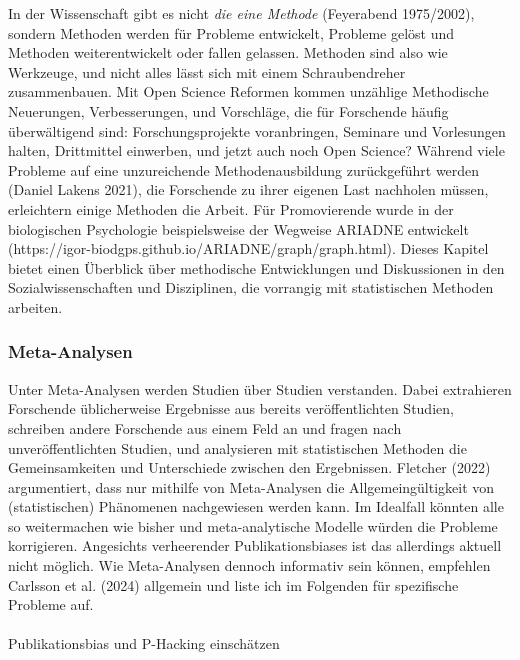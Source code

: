\documentclass[
  letterpaper,
  DIV=11,
  numbers=noendperiod]{scrreprt}
\makeatletter
\let\oldparagraph\paragraph
\renewcommand{\paragraph}{
    \@ifstar
      \xxxParagraphStar
      \xxxParagraphNoStar
  }
\newcommand{\xxxParagraphStar}[1]{\oldparagraph*{#1}\mbox{}}
\newcommand{\xxxParagraphNoStar}[1]{\oldparagraph{#1}\mbox{}}
\makeatother
\begin{document}
In der Wissenschaft gibt es nicht \emph{die eine Methode} (Feyerabend
1975/2002), sondern Methoden werden für Probleme entwickelt, Probleme
gelöst und Methoden weiterentwickelt oder fallen gelassen. Methoden sind
also wie Werkzeuge, und nicht alles lässt sich mit einem Schraubendreher
zusammenbauen. Mit Open Science Reformen kommen unzählige Methodische
Neuerungen, Verbesserungen, und Vorschläge, die für Forschende häufig
überwältigend sind: Forschungsprojekte voranbringen, Seminare und
Vorlesungen halten, Drittmittel einwerben, und jetzt auch noch Open
Science? Während viele Probleme auf eine unzureichende
Methodenausbildung zurückgeführt werden (Daniel Lakens 2021), die
Forschende zu ihrer eigenen Last nachholen müssen, erleichtern einige
Methoden die Arbeit. Für Promovierende wurde in der biologischen
Psychologie beispielsweise der Wegweise ARIADNE entwickelt
(https://igor-biodgps.github.io/ARIADNE/graph/graph.html). Dieses
Kapitel bietet einen Überblick über methodische Entwicklungen und
Diskussionen in den Sozialwissenschaften und Disziplinen, die vorrangig
mit statistischen Methoden arbeiten.

\subsubsection{Meta-Analysen}\label{meta-analysen}

Unter Meta-Analysen werden Studien über Studien verstanden. Dabei
extrahieren Forschende üblicherweise Ergebnisse aus bereits
veröffentlichten Studien, schreiben andere Forschende aus einem Feld an
und fragen nach unveröffentlichten Studien, und analysieren mit
statistischen Methoden die Gemeinsamkeiten und Unterschiede zwischen den
Ergebnissen. Fletcher (2022) argumentiert, dass nur mithilfe von
Meta-Analysen die Allgemeingültigkeit von (statistischen) Phänomenen
nachgewiesen werden kann. Im Idealfall könnten alle so weitermachen wie
bisher und meta-analytische Modelle würden die Probleme korrigieren.
Angesichts verheerender Publikationsbiases ist das allerdings aktuell
nicht möglich. Wie Meta-Analysen dennoch informativ sein können,
empfehlen Carlsson et al. (2024) allgemein und liste ich im Folgenden
für spezifische Probleme auf.

\paragraph{Publikationsbias und P-Hacking
einschätzen}\label{publikationsbias-und-p-hacking-einschuxe4tzen}
\end{document}
